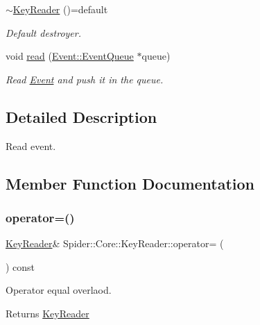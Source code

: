 \begin{DoxyCompactItemize}
\hyperlink{class_spider_1_1_core_1_1_key_reader_a7792d49fd03445cfdd3b72ad6a5009cb}{$\sim$\+Key\+Reader} ()=default
\begin{DoxyCompactList}\small\item\em Default destroyer. \end{DoxyCompactList}\item 
void \hyperlink{class_spider_1_1_core_1_1_key_reader_a4b44cc097ccd3c508336217b4b17f8b4}{read} (\hyperlink{class_spider_1_1_event_1_1_event_queue}{Event\+::\+Event\+Queue} $\ast$queue)
\begin{DoxyCompactList}\small\item\em Read \hyperlink{namespace_spider_1_1_event}{Event} and push it in the queue. \end{DoxyCompactList}\end{DoxyCompactItemize}


\subsection{Detailed Description}
Read event. 

\subsection{Member Function Documentation}
\mbox{\label{class_spider_1_1_core_1_1_key_reader_a17eaa634915bdca4e3e32bac7a0bad39}} 
\subsubsection{\texorpdfstring{operator=()}{operator=()}}
{\footnotesize\ttfamily \hyperlink{class_spider_1_1_core_1_1_key_reader}{Key\+Reader}\& Spider\+::\+Core\+::\+Key\+Reader\+::operator= (\begin{DoxyParamCaption}\item[{const \hyperlink{class_spider_1_1_core_1_1_key_reader}{Key\+Reader} \&}]{ }\end{DoxyParamCaption}) const\hspace{0.3cm}{\ttfamily [delete]}}



Operator equal overlaod. 

\begin{DoxyReturn}{Returns}
\hyperlink{class_spider_1_1_core_1_1_key_reader}{Key\+Reader} 
\end{DoxyReturn}
\mbox{\label{class_spider_1_1_core_1_1_key_reader_a4b44cc097ccd3c508336217b4b17f8b4}} 
